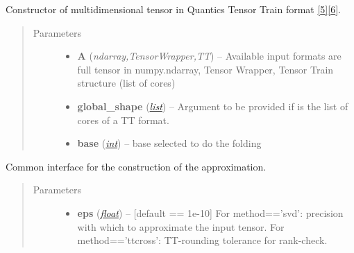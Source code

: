 \documentclass[a4paper,10pt,english]{sphinxmanual}
\begin{document}
\begin{fulllineitems}
\label{api-qttvec:TensorToolbox.core.QTTvec}
Constructor of multidimensional tensor in Quantics Tensor Train format {\hyperref[zrefs:khoromskij2010]{{[}5{]}}}{\hyperref[zrefs:khoromskij2011]{{[}6{]}}}.
\begin{quote}\begin{description}
\item[{Parameters}] \leavevmode\begin{itemize}
\item {} 
\textbf{A} (\emph{ndarray,TensorWrapper,TT}) -- Available input formats are full tensor in numpy.ndarray, Tensor Wrapper, Tensor Train structure (list of cores)

\item {} 
\textbf{global\_shape} (\href{http://docs.python.org/library/functions.html\#list}{\emph{list}}) -- Argument to be provided if  is the list of cores of a TT format.

\item {} 
\textbf{base} (\href{http://docs.python.org/library/functions.html\#int}{\emph{int}}) -- base selected to do the folding

\end{itemize}

\end{description}\end{quote}

\begin{fulllineitems}
\label{api-qttvec:TensorToolbox.core.QTTvec.build}
Common interface for the construction of the approximation.
\begin{quote}\begin{description}
\item[{Parameters}] \leavevmode\begin{itemize}
\item {} 
\textbf{eps} (\href{http://docs.python.org/library/functions.html\#float}{\emph{float}}) -- {[}default == 1e-10{]} For method=='svd': precision with which to approximate the input tensor. For method=='ttcross': TT-rounding tolerance for rank-check.


\end{itemize}
\end{description}
\end{quote}
\end{fulllineitems}
\end{fulllineitems}
\end{document}
